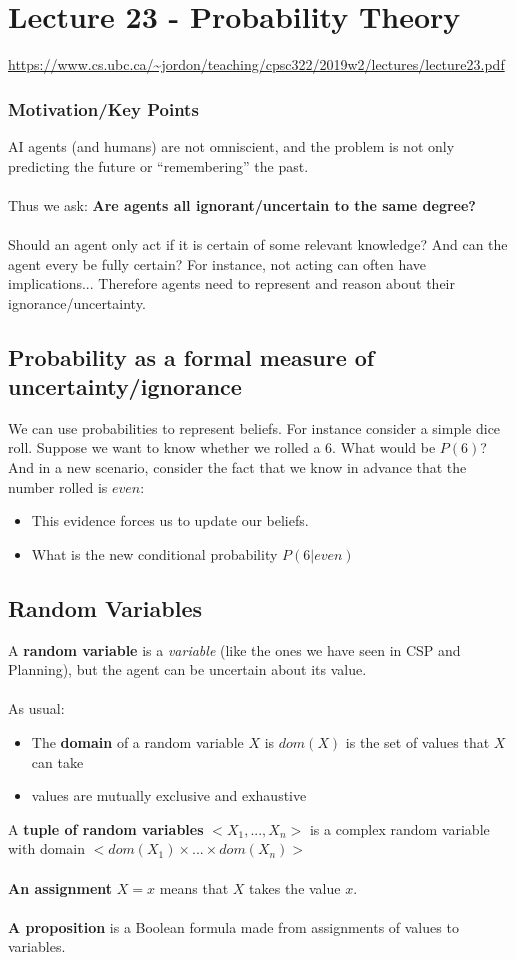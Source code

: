 \documentclass{article}
\def\blu#1{{\color{blu}#1}}
\def\gre#1{{\color{gre}#1}}
\begin{document}
\section*{Lecture 23 - Probability Theory}
\url{https://www.cs.ubc.ca/~jordon/teaching/cpsc322/2019w2/lectures/lecture23.pdf}
\subsubsection*{Motivation/Key Points}
AI agents (and humans) are not omniscient, and the problem is not only predicting the future or “remembering” the past. \\ \\Thus we ask: \textbf{Are agents all ignorant/uncertain to the same degree?} \\ \\
Should an agent only act if it is certain of some relevant knowledge? And can the agent every be fully certain? For instance, not acting can often have implications... Therefore agents need to represent and reason about their ignorance/uncertainty.

\subsection*{Probability as a formal measure of uncertainty/ignorance}
We can use probabilities to represent beliefs. For instance consider a simple dice roll. Suppose we want to know whether we rolled a 6. What would be $ P(6) $? And in a new scenario, consider the fact that we know in advance that the number rolled is $ even $:
\begin{itemize}
	\item This evidence forces us to update our beliefs.
	\item What is the new conditional probability $ P(6|even) $
\end{itemize}

\subsection*{Random Variables}
A \textbf{random variable} is a \textit{variable} (like the ones we have seen in CSP and Planning), but the agent can be uncertain about its value. \\
\\
As usual:
\begin{itemize}
	\item The \textbf{domain} of a random variable $ X $ is $ dom(X) $ is the set of values that $ X $ can take
	\item values are mutually exclusive and exhaustive
\end{itemize}
A \textbf{tuple of random variables} $ <X_1, ..., X_n > $ is a \blu{complex random variable} with domain \gre{$< dom(X_1) \times ... \times dom(X_n) > $} \\
\\
\textbf{\blu{An assignment}} $ X = x $ means that $ X $ takes the value $ x $. \\
\\
\textbf{A \textbf{proposition}} is a Boolean formula made from assignments of values to variables.
\end{document}
